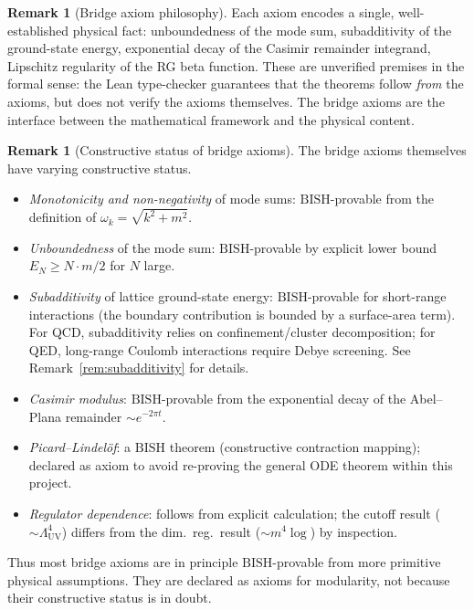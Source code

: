 \documentclass[11pt,a4paper]{article}
\theoremstyle{plain}
\theoremstyle{definition}
\newtheorem{remark}[theorem]{Remark}
\newcommand{\BISH}{\ensuremath{\mathrm{BISH}}}
\begin{document}
\begin{remark}[Bridge axiom philosophy]
Each axiom encodes a single, well-established physical fact:
unboundedness of the mode sum, subadditivity of the ground-state energy,
exponential decay of the Casimir remainder integrand, Lipschitz
regularity of the RG beta function.  These are unverified premises
in the formal sense: the Lean type-checker guarantees that the
theorems follow \emph{from} the axioms, but does not verify the
axioms themselves.  The bridge axioms are the interface between the
mathematical framework and the physical content.
\end{remark}

\begin{remark}[Constructive status of bridge axioms]\label{rem:bridge-status}
The bridge axioms themselves have varying constructive status.
\begin{itemize}[nosep]
\item \emph{Monotonicity and non-negativity} of mode sums:
  $\BISH$-provable from the definition of $\omega_k = \sqrt{k^2 + m^2}$.
\item \emph{Unboundedness} of the mode sum: $\BISH$-provable
  by explicit lower bound $E_N \geq N \cdot m / 2$ for $N$ large.
\item \emph{Subadditivity} of lattice ground-state energy:
  $\BISH$-provable for short-range interactions (the boundary
  contribution is bounded by a surface-area term).  For QCD,
  subadditivity relies on confinement/cluster decomposition;
  for QED, long-range Coulomb interactions require Debye screening.
  See Remark~\ref{rem:subadditivity} for details.
\item \emph{Casimir modulus}: $\BISH$-provable from the exponential
  decay of the Abel--Plana remainder $\sim e^{-2\pi t}$.
\item \emph{Picard--Lindel\"of}: a $\BISH$ theorem
  (constructive contraction mapping); declared as axiom to avoid
  re-proving the general ODE theorem within this project.
\item \emph{Regulator dependence}: follows from explicit
  calculation; the cutoff result ($\sim\Lambda_{\mathrm{UV}}^4$)
  differs from the dim.\ reg.\ result ($\sim m^4 \log$) by inspection.
\end{itemize}
Thus most bridge axioms are in principle $\BISH$-provable from
more primitive physical assumptions.  They are declared as axioms
for modularity, not because their constructive status is in doubt.
\end{remark}
\end{document}
